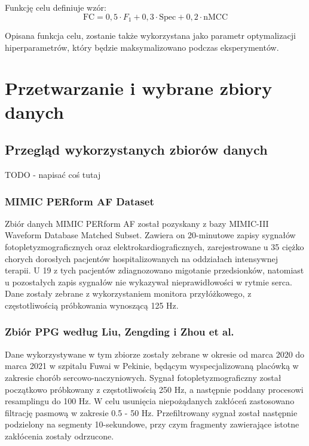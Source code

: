 \documentclass[a4paper,twoside,12pt]{book}
\begin{document}
\begin{itemize}
	      Funkcję celu definiuje wzór:
	      \begin{equation}
		      \text{FC} = 0{,}5 \cdot F_1 + 0{,}3 \cdot \text{Spec} +  0{,}2 \cdot \text{nMCC}
	      \end{equation}

	      Opisana funkcja celu, zostanie także wykorzystana jako parametr optymalizacji hiperparametrów, który będzie maksymalizowano podczas eksperymentów.

\end{itemize}















\chapter{Przetwarzanie i wybrane zbiory danych}
\section{Przegląd wykorzystanych zbiorów danych}
TODO - napisać coś tutaj
\subsection{MIMIC PERform AF Dataset}
Zbiór danych MIMIC PERform AF\cite{mimic_perform_af} został pozyskany z bazy MIMIC-III Waveform Database Matched Subset\cite{mimiciii_waveform_matched}. Zawiera on 20-minutowe zapisy sygnałów fotopletyzmograficznych oraz elektrokardiograficznych, zarejestrowane u 35 ciężko chorych dorosłych pacjentów hospitalizowanych na oddziałach intensywnej terapii. U 19 z tych pacjentów zdiagnozowano migotanie przedsionków, natomiast u pozostałych zapis sygnałów nie wykazywał nieprawidłowości w rytmie serca. Dane zostały zebrane z wykorzystaniem monitora przyłóżkowego, z częstotliwością próbkowania wynoszącą 125 Hz.

\subsection{Zbiór PPG według Liu, Zengding i Zhou et al.}
Dane wykorzystywane w tym zbiorze\cite{liu2022multiclass} zostały zebrane w okresie od marca 2020 do marca 2021 w szpitalu Fuwai w Pekinie, będącym wyspecjalizowaną placówką w zakresie chorób sercowo-naczyniowych. Sygnał fotopletyzmograficzny został początkowo próbkowany z częstotliwością 250 Hz, a następnie poddany procesowi resamplingu do 100 Hz. W celu usunięcia niepożądanych zakłóceń zastosowano filtrację pasmową w zakresie 0.5 - 50 Hz. Przefiltrowany sygnał został następnie podzielony na segmenty 10-sekundowe, przy czym fragmenty zawierające istotne zakłócenia zostały odrzucone.
\end{document}
